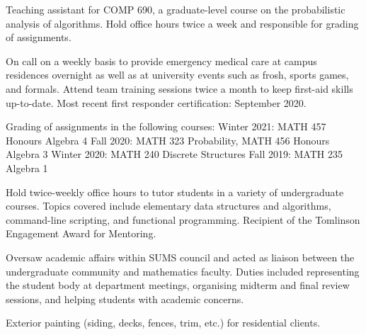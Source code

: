 
\smallskip
Teaching assistant for COMP 690, a graduate-level course on the probabilistic analysis of algorithms.
Hold office hours twice a week and responsible for grading of assignments.
\medbreak

\smallskip
On call on a weekly basis to provide emergency medical care at campus residences overnight as well as at
university events such as frosh, sports games, and formals. Attend team training sessions twice a month to keep
first-aid skills up-to-date. Most recent first responder certification: September 2020.
\medbreak

\smallskip
Grading of assignments in the following courses:
\begingroup\parindent=10pt
\smallskip
\thing Winter 2021: MATH 457 Honours Algebra 4
\smallskip
\thing Fall 2020: MATH 323 Probability, MATH 456 Honours Algebra 3
\smallskip
\thing Winter 2020: MATH 240 Discrete Structures
\smallskip
\thing Fall 2019: MATH 235 Algebra 1
\endgroup
\medbreak

\smallskip
Hold twice-weekly office hours to tutor students in a variety of undergraduate courses.
Topics covered include elementary data structures and algorithms, command-line scripting,
and functional programming. Recipient of the Tomlinson Engagement Award for Mentoring.
\medbreak


\smallskip
Oversaw academic affairs within SUMS council and acted as liaison between the undergraduate community and
mathematics faculty. Duties included representing the student body at department meetings,
organising midterm and final review sessions,
and helping students with
academic concerns.
\medbreak

\smallskip
Exterior painting (siding, decks, fences, trim, etc.) for residential clients.
\medbreak

